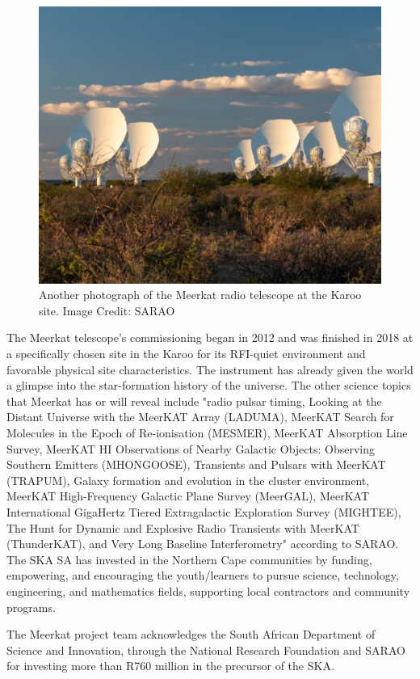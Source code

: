 \documentclass[12pt,a4paper]{report}
\begin{document}
	
	\begin{figure}[h!]
		\centering
		\includegraphics[width=0.7\linewidth]{2018-MeerKAT-5-495x400}
		\caption{Another photograph of the Meerkat radio telescope at the Karoo site. Image Credit: SARAO}
		\label{fig:2018-MeerKAT-5-495x400}
	\end{figure}
	
	The Meerkat telescope's commissioning began in 2012 and was finished in 2018 at a specifically chosen site in the Karoo for its RFI-quiet environment and favorable physical site characteristics. The instrument has already given the world a glimpse into the star-formation history of the universe. The other science topics that Meerkat has or will reveal include "radio pulsar timing, Looking at the Distant Universe with the MeerKAT Array (LADUMA), MeerKAT Search for Molecules in the Epoch of Re-ionisation (MESMER), MeerKAT Absorption Line Survey, MeerKAT HI Observations of Nearby Galactic Objects: Observing Southern Emitters (MHONGOOSE), Transients and Pulsars with MeerKAT (TRAPUM), Galaxy formation and evolution in the cluster environment, MeerKAT High-Frequency Galactic Plane Survey (MeerGAL), MeerKAT International GigaHertz Tiered Extragalactic Exploration Survey (MIGHTEE), The Hunt for Dynamic and Explosive Radio Transients with MeerKAT (ThunderKAT), and Very Long Baseline Interferometry" according to SARAO.\\
	
	The SKA SA has invested in the Northern Cape communities by funding, empowering, and encouraging the youth/learners to pursue science, technology, engineering, and mathematics fields, supporting local contractors and community programs.
	
	The Meerkat project team acknowledges the South African Department of Science and Innovation, through the National Research Foundation and SARAO for investing more than R760 million in the precursor of the SKA.
	
\end{document}
